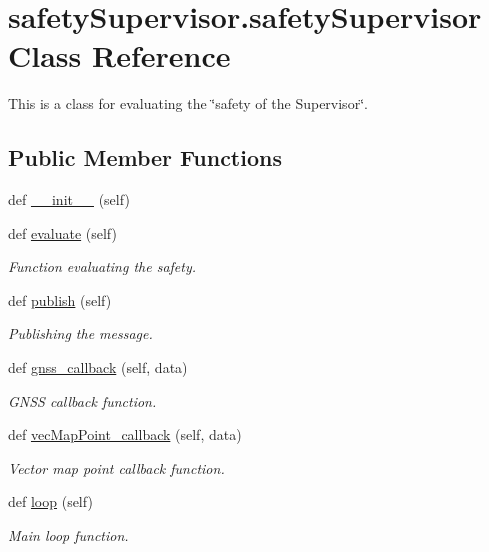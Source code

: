 \hypertarget{classsafetySupervisor_1_1safetySupervisor}{}\section{safety\+Supervisor.\+safety\+Supervisor Class Reference}
\label{classsafetySupervisor_1_1safetySupervisor}


This is a class for evaluating the \char`\"{}safety of the Supervisor\char`\"{}.  


\subsection*{Public Member Functions}
\begin{DoxyCompactItemize}
\item 
def \hyperlink{classsafetySupervisor_1_1safetySupervisor_a410d83f6ced10353411df8dc093b205f}{\+\_\+\+\_\+init\+\_\+\+\_\+} (self)
\item 
def \hyperlink{classsafetySupervisor_1_1safetySupervisor_ab4367faaa605efea70d7b8bf9c58639f}{evaluate} (self)
\begin{DoxyCompactList}\small\item\em Function evaluating the safety. \end{DoxyCompactList}\item 
def \hyperlink{classsafetySupervisor_1_1safetySupervisor_a3ca518f1329f3ef3d0443224470d6786}{publish} (self)
\begin{DoxyCompactList}\small\item\em Publishing the message. \end{DoxyCompactList}\item 
def \hyperlink{classsafetySupervisor_1_1safetySupervisor_a31c21afaf60ee7f2e3f7a38f9cf1dcfb}{gnss\+\_\+callback} (self, data)
\begin{DoxyCompactList}\small\item\em G\+N\+SS callback function. \end{DoxyCompactList}\item 
def \hyperlink{classsafetySupervisor_1_1safetySupervisor_ac8f9d6904cbd5a54417802c547a36096}{vec\+Map\+Point\+\_\+callback} (self, data)
\begin{DoxyCompactList}\small\item\em Vector map point callback function. \end{DoxyCompactList}\item 
def \hyperlink{classsafetySupervisor_1_1safetySupervisor_aa2fcdc304631929a13285af6785a2340}{loop} (self)
\begin{DoxyCompactList}\small\item\em Main loop function. \end{DoxyCompactList}\end{DoxyCompactItemize}
